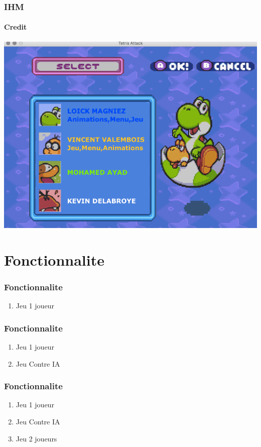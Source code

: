 \documentclass{beamer}
\begin{document}
\begin{darkframes}
     \begin{frame}
 	 \frametitle{IHM}
 	 \begin{center}
 	 \framesubtitle{Credit}
		\includegraphics[scale=0.40]{./Image/credit.png}
		\end{center}
    \end{frame}
    
    \section{Fonctionnalite}
 \begin{frame}
 	 \frametitle{Fonctionnalite}
 	   \begin{enumerate}
    \item Jeu 1 joueur 
  \end{enumerate}
    \end{frame}
    
 \begin{frame}
 	 \frametitle{Fonctionnalite}
 	   \begin{enumerate}
    \item Jeu 1 joueur 
    \item Jeu Contre IA
  \end{enumerate}
    \end{frame}
    
 \begin{frame}
 	 \frametitle{Fonctionnalite}
 	   \begin{enumerate}
    \item Jeu 1 joueur 
    \item Jeu Contre IA
    \item Jeu 2 joueurs 
  \end{enumerate}
    \end{frame}
    

\end{darkframes}
\end{document}
